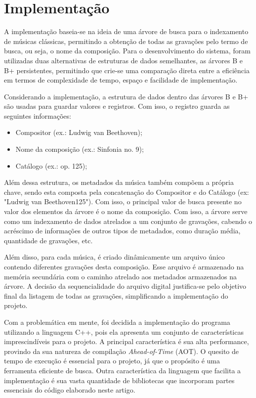 \documentclass[12pt]{article}
\begin{document}
\section{Implementação} \label{sec:implementation}

A implementação baseia-se na ideia de uma árvore de busca para o indexamento de
músicas clássicas, permitindo a obtenção de todas as gravações pelo termo de
busca, ou seja, o nome da composição. Para o desenvolvimento do sistema, foram
utilizadas duas alternativas de estruturas de dados semelhantes, as árvores B e
B\nolinebreak+ persistentes, permitindo que crie-se uma comparação direta entre
a eficiência em termos de complexidade de tempo, espaço e facilidade de
implementação.

Considerando a implementação, a estrutura de dados dentro das árvores B e
B\nolinebreak+ são usadas para guardar valores e registros. Com isso, o registro
guarda as seguintes informações:
\begin{itemize}
  \item Compositor (ex.: Ludwig van Beethoven);
  \item Nome da composição (ex.: Sinfonia no. 9);
  \item Catálogo (ex.: op. 125);
\end{itemize}

Além dessa estrutura, os metadados da música também compõem a própria chave,
sendo esta composta pela concatenação do Compositor e do Catálogo (ex: "Ludwig
van Beethoven125"). Com isso, o principal valor de busca presente no valor dos
elementos da árvore é o nome da composição. Com isso, a árvore serve como um
indexamento de dados atrelados a um conjunto de gravações, cabendo o acréscimo
de informações de outros tipos de metadados, como duração média, quantidade de
gravações, etc.

Além disso, para cada música, é criado dinâmicamente um arquivo único contendo diferentes gravações 
desta composição. Esse arquivo é armazenado na memória secundária com o caminho
atrelado aos metadados armazenados na árvore. A decisão da sequencialidade do
arquivo digital justifica-se pelo objetivo final da listagem de todas as
gravações, simplificando a implementação do projeto.

Com a problemática em mente, foi decidida a implementação do programa utilizando
a linguagem C++, pois ela apresenta um conjunto de características
imprescindíveis para o projeto. A principal característica é sua alta
performance, provindo da sua natureza de compilação \emph{Ahead-of-Time} (AOT).
O quesito de tempo de execução é essencial para o projeto, já que o propósito é
uma ferramenta eficiente de busca. Outra característica da linguagem que
facilita a implementação é sua vasta quantidade de bibliotecas que incorporam
partes essenciais do código elaborado neste artigo.
\end{document}
